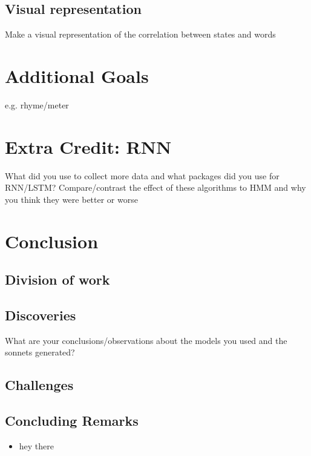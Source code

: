 \subsection{Visual representation}
Make a visual representation of the correlation between states and words



\section{Additional Goals}
e.g. rhyme/meter



\section{Extra Credit: RNN}
What did you use to collect more data and what packages did you use for RNN/LSTM?
Compare/contrast the effect of these algorithms to HMM and why you think they were better or worse



\section{Conclusion}
\subsection{Division of work}
\subsection{Discoveries}
What are your conclusions/observations about the models you used and the sonnets generated?
\subsection{Challenges}
\subsection{Concluding Remarks}

\begin{itemize}

\item hey there

\end{itemize}


